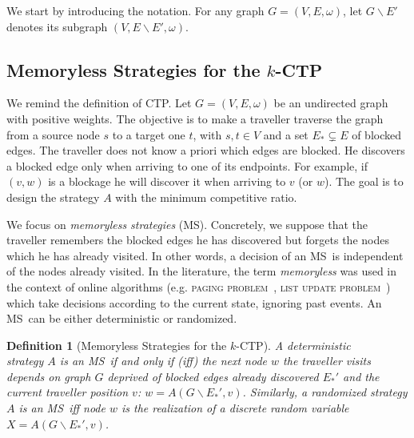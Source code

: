 \documentclass[preprint]{elsarticle}
\newtheorem{definition}{Definition}
\newcommand{\kctp}{$k$-CTP}
\newcommand{\stpath}{$(s,t)$-path}
\newcommand{\mts}{MS}
\begin{document}
We start by introducing the notation. For any graph $G=\left(V,E,\omega\right)$, let $G\backslash E'$ denotes its subgraph $\left(V,E\backslash E',\omega\right)$. 

\subsection{Memoryless Strategies for the \kctp} \label{subsec:msintro}

We remind the definition of CTP. Let $G=\left(V,E,\omega\right)$ be an undirected graph with positive weights. The objective is to make a traveller traverse the graph from a source node $s$ to a target one $t$, with $s,t \in V$ and a set $E_* \subsetneq E$ of blocked edges. %
The traveller does not know a priori which edges are blocked. He discovers a blocked edge only when arriving to one of its endpoints. For example, if $\left(v,w\right)$ is a blockage he will discover it when arriving to $v$ (or $w$). The goal is to design the strategy $A$ with the minimum competitive ratio.

We focus on \textit{memoryless strategies} (\mts). Concretely, we suppose that the traveller remembers the blocked edges he has discovered but forgets the nodes which he has already visited. In other words, a decision of an \mts ~is independent of the nodes already visited. In the literature, the term \textit{memoryless} was used in the context of online algorithms (e.g. \textsc{paging problem}~\cite{BoEl98}, \textsc{list update problem}~\cite{Al03}) which take decisions according to the current state, ignoring past events. An \mts ~can be either deterministic or randomized.



\begin{definition}[Memoryless Strategies for the \kctp]
A deterministic \\strategy $A$ is an \mts ~if and only if (iff) the next node $w$ the traveller visits depends on graph $G$ deprived of blocked edges already discovered $E_*'$ and the current traveller position $v$: $w = A\left(G\backslash E_*',v\right)$. Similarly, a randomized strategy $A$ is an \mts ~iff node $w$ is the realization of a discrete random variable $X = A\left(G\backslash E_*',v\right)$.
\end{definition}
\end{document}
